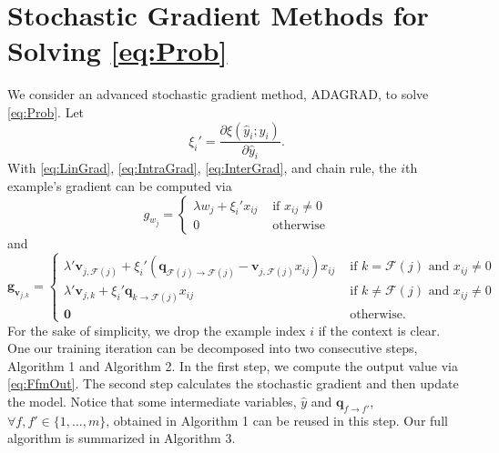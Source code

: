 \documentclass[11pt]{article}
\newcommand{\bsym}[1]{\ensuremath{\boldsymbol{#1}}}
\newcommand{\bg}{\ensuremath{\bsym{g}}}
\newcommand{\bv}{\ensuremath{\bsym{v}}}
\newcommand{\bq}{\ensuremath{\bsym{q}}}
\newcommand{\field}{\ensuremath{\mathcal F}}
\begin{document}
\section{Stochastic Gradient Methods for Solving \eqref{eq:Prob}}
We consider an advanced stochastic gradient method, ADAGRAD, to solve \eqref{eq:Prob}.
Let
\begin{equation*}
    \xi_i' = \frac{\partial \xi(\hat{y}_i; y_i)}{\partial \hat{y}_i}.
\end{equation*}
With \eqref{eq:LinGrad}, \eqref{eq:IntraGrad}, \eqref{eq:InterGrad}, and chain rule, the $i$th example's gradient can be computed via
\begin{equation}
    g_{w_j} = 
    \begin{cases}
        \lambda w_j + \xi_i' x_{ij} &\text{ if } x_{ij} \ne 0\\
        0 &\text{ otherwise}
    \end{cases}
    \label{eq:GradW}
\end{equation}
and
\begin{equation}
    \bg_{\bv_{j, k}} = 
    \begin{cases}
        \lambda' \bv_{j,\field(j)} + \xi_i' (\bq_{\field(j) \rightarrow \field(j)} - \bv_{j, \field(j)}x_{ij}) x_{ij} & \text{ if } k=\field(j) \text{ and } x_{ij}\ne 0\\
        \lambda' \bv_{j,k} + \xi_i' \bq_{k\rightarrow \field(j)} x_{ij} & \text{ if } k\ne \field(j) \text{ and } x_{ij}\ne 0\\
        \bsym{0} & \text{ otherwise}.
    \end{cases}
    \label{eq:GradV}
\end{equation}
For the sake of simplicity, we drop the example index $i$ if the context is clear.
One our training iteration can be decomposed into two consecutive steps, Algorithm 1 and Algorithm 2.
In the first step, we compute the output value via \eqref{eq:FfmOut}.
The second step calculates the stochastic gradient and then update the model.
Notice that some intermediate variables, $\hat{y}$ and $\bq_{f\rightarrow f'}$, $\forall f,f'\in\{1,\dots,m\}$, obtained in Algorithm 1 can be reused in this step.
Our full algorithm is summarized in Algorithm 3.
\end{document}
